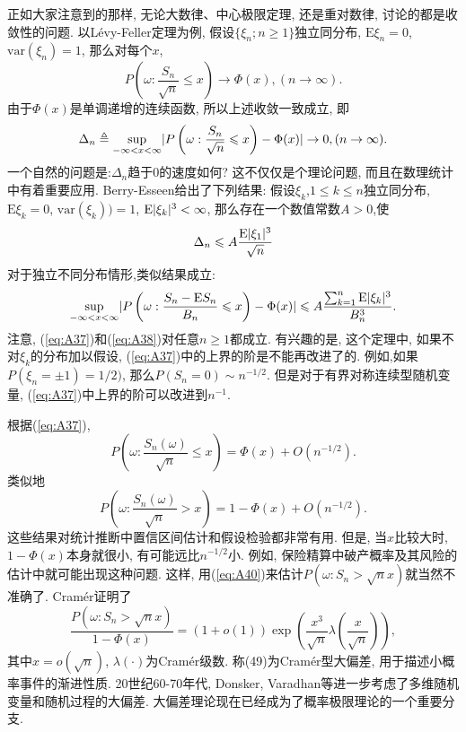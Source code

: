 正如大家注意到的那样, 无论大数律、中心极限定理, 还是重对数律, 讨论的都是收敛性的问题. 以Lévy-Feller定理为例, 假设$\{\xi_n;n\geqslant 1\}$独立同分布, $\mathrm{E}\xi_n = 0$,$\mathrm{var}(\xi_n) = 1$, 那么对每个$x$,\begin{equation}\label{eq:A35}
P\left( \omega:\frac{S_n}{\sqrt{n}}\leqslant x \right)\to\Phi(x), (n\to\infty).
\end{equation}
由于$\Phi(x)$是单调递增的连续函数, 所以上述收敛一致成立, 即\begin{equation}\label{eq:A36}
\Delta_n\triangleq \sup_{-\infty<x<\infty}\lvert P\left( \omega:\frac{S_n}{\sqrt{n}}\leqslant x \right)-\Phi(x)\rvert\to 0,(n\to\infty).
\end{equation}
一个自然的问题是:$\Delta_n$趋于0的速度如何? 这不仅仅是个理论问题, 而且在数理统计中有着重要应用. Berry-Esseen给出了下列结果: 假设$\xi_k$,$1\leqslant k\leqslant n$独立同分布, $\mathrm{E}\xi_k = 0$, $\mathrm{var}(\xi_k)) = 1$, $\mathrm{E}\lvert\xi_k\rvert^3<\infty$, 那么存在一个数值常数$A>0$,使\begin{equation}\label{eq:A37}
\Delta_n\leqslant A\frac{\mathrm{E}\lvert\xi_1\rvert^3}{\sqrt{n}}
\end{equation}
对于独立不同分布情形,类似结果成立:
\begin{equation}\label{eq:A38}
\sup_{-\infty<x<\infty}\lvert P\left( \omega:\frac{S_n-\mathrm{E}S_n}{B_n}\leqslant x \right)-\Phi(x)\rvert\leqslant A\frac{\sum_{k=1}^n\mathrm{E}\lvert\xi_k\rvert^3}{B_n^3}.
\end{equation}
注意, (\ref{eq:A37})和(\ref{eq:A38})对任意$n\geqslant 1$都成立. 有兴趣的是, 这个定理中, 如果不对$\xi_k$的分布加以假设, (\ref{eq:A37})中的上界的阶是不能再改进了的. 例如,如果$P(\xi_n = \pm 1)=1/2)$, 那么$P(S_n = 0) \sim n^{-1/2}$. 但是对于有界对称连续型随机变量, (\ref{eq:A37})中上界的阶可以改进到$n^{-1}$.

根据(\ref{eq:A37}),\begin{equation}\label{eq:A39}
P(\omega:\frac{S_n(\omega)}{\sqrt{n}}\leqslant x) = \Phi(x)+O(n^{-1/2}).
\end{equation}
类似地\begin{equation}\label{eq:A40}
P(\omega:\frac{S_n(\omega)}{\sqrt{n}}> x) = 1-\Phi(x)+O(n^{-1/2}).
\end{equation}
这些结果对统计推断中置信区间估计和假设检验都非常有用. 但是, 当$x$比较大时, $1-\Phi(x)$本身就很小, 有可能远比$n^{-1/2}$小. 例如, 保险精算中破产概率及其风险的估计中就可能出现这种问题. 这样, 用(\ref{eq:A40})来估计$P(\omega:S_n>\sqrt{n}x)$就当然不准确了. Cramér证明了\begin{equation}\label{eq:A41}
\frac{P(\omega:S_n>\sqrt{n}x)}{1-\Phi(x)} = (1+o(1))\exp(\frac{x^3}{\sqrt{n}}\lambda(\frac{x}{\sqrt{n}})),
\end{equation}
其中$x=o(\sqrt{n})$, $\lambda(\cdot)$为Cramér级数. 称(49)为Cramér型大偏差, 用于描述小概率事件的渐进性质. 20世纪60-70年代, Donsker, Varadhan等进一步考虑了多维随机变量和随机过程的大偏差. 大偏差理论现在已经成为了概率极限理论的一个重要分支.

